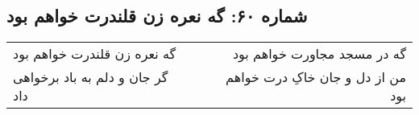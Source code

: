 \begin{center}
\section*{شماره ۶۰: گه نعره زن قلندرت خواهم بود}
\label{sec:060}
\begin{longtable}{l p{0.5cm} r}
گه نعره زن قلندرت خواهم بود
&&
گه در مسجد مجاورت خواهم بود
\\
گر جان و دلم به باد برخواهی داد
&&
من از دل و جان خاکِ درت خواهم بود
\\
\end{longtable}
\end{center}
